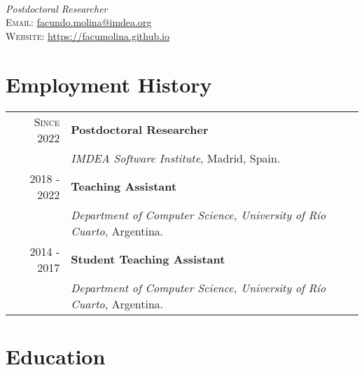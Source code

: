 \documentclass[a4paper,10pt]{article} %
\begin{document}
\pagestyle{empty} %


{} \\
\textit{Postdoctoral Researcher} \\
\textsc{Email:} \href{mailto:facundo.molina@imdea.org}{facundo.molina@imdea.org} \\
\textsc{Website:} \href{https://facumolina.github.io}{https://facumolina.github.io}

\section{Employment History}

\begin{tabular}{rl}
\\
\textsc{Since 2022}	& \textbf{Postdoctoral Researcher} \\
& \textit{IMDEA Software Institute}, Madrid, Spain. \\

\textsc{2018 - 2022} & \textbf{Teaching Assistant} \\ & \textit{Department of Computer Science, University of Río Cuarto}, Argentina. \\

\textsc{2014 - 2017} & \textbf{Student Teaching Assistant} \\
& \textit{Department of Computer Science, University of Río Cuarto}, Argentina. \\
\end{tabular}


\section{Education}
\end{document}
